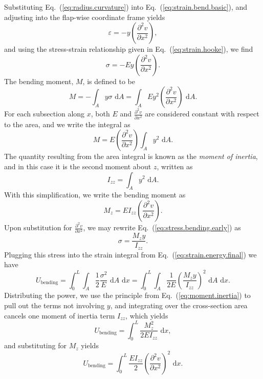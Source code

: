 Substituting Eq.~(\ref{eq:radius.curvature}) into Eq.~(\ref{eq:strain.bend.basic}), and adjusting into the flap-wise coordinate frame yields
\begin{equation}
\varepsilon = -y\left(\frac{\partial^2v}{\partial x^2}\right),
\end{equation}
and using the stress-strain relationship given in Eq.~(\ref{eq:strain.hooke}), we find
\begin{equation}
\sigma = -Ey\left(\frac{\partial^2v}{\partial x^2}\right).
\label{eq:stress.bending.early}
\end{equation}
The bending moment, $M$, is defined to be 
\begin{equation}
M = -\int_Ay\sigma \text{ d}A = \int_AEy^2\left(\frac{\partial^2v}{\partial x^2}\right)\text{ d}A.
\end{equation}
For each subsection along $x$, both $E$ and $\frac{\partial^2v}{\partial x^2}$ are considered constant with respect to the area, and we write the integral as
\begin{equation}
M = E\left(\frac{\partial^2v}{\partial x^2}\right)\int_Ay^2\text{ d}A.
\label{eq:moment.inertia}
\end{equation}
The quantity resulting from the area integral is known as the \emph{moment of inertia}, and in this case it is the second moment about $z$, written as
\begin{equation}
I_{zz} = \int_Ay^2\text{ d}A.
\end{equation}
With this simplification, we write the bending moment as
\begin{equation}
M_z = EI_{zz}\left(\frac{\partial^2v}{\partial x^2}\right).
\end{equation}
Upon substitution for $\frac{\partial^2v}{\partial x^2}$, we may rewrite Eq.~(\ref{eq:stress.bending.early}) as
\begin{equation}
\sigma = \frac{M_zy}{I_{zz}}.
\label{eq:stress.bending.full}
\end{equation}
Plugging this stress into the strain integral from Eq.~(\ref{eq:strain.energy.final}) we have
\begin{equation}
U_{\text{bending}} = \int_0^L\int_A\frac{1}{2}\frac{\sigma^2}{E}\text{ d}A\text{ d}x = \int_0^L\int_A\frac{1}{2E}\left(\frac{M_zy}{I_{zz}}\right)^2\text{ d}A\text{ d}x.
\end{equation}
Distributing the power, we use the principle from Eq.~(\ref{eq:moment.inertia}) to pull out the terms not involving $y$, and integrating over the cross-section area cancels one moment of inertia term $I_{zz}$, which yields
\begin{equation}
U_{\text{bending}} = \int_0^L\frac{M_z^2}{2EI_{zz}}\text{ d}x,
\end{equation}
and substituting for $M_z$ yields
\begin{equation}
U_{\text{bending}} = \int_0^L\frac{EI_{zz}}{2}\left(\frac{\partial^2 v}{\partial x^2}\right)^2\text{ d}x.
\label{eq:strain.bending.final}
\end{equation}

